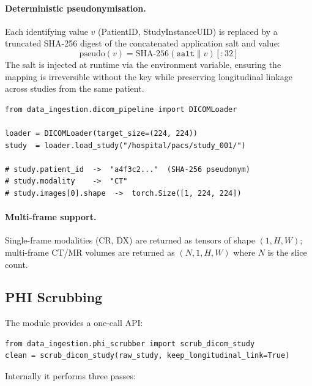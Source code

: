 \paragraph{Deterministic pseudonymisation.}
Each identifying value $v$ (PatientID, StudyInstanceUID) is replaced by a
truncated SHA-256 digest of the concatenated application salt and value:
\begin{equation}
  \mathrm{pseudo}(v) = \mathrm{SHA\text{-}256}(\texttt{salt} \| v)[:32]
  \label{eq:pseudo}
\end{equation}
The salt is injected at runtime via the
 environment variable, ensuring the mapping
is irreversible without the key while preserving longitudinal linkage across
studies from the same patient.

\begin{lstlisting}[caption={Using the DICOM loader.},
                   label={lst:dicom}]
from data_ingestion.dicom_pipeline import DICOMLoader

loader = DICOMLoader(target_size=(224, 224))
study  = loader.load_study("/hospital/pacs/study_001/")

# study.patient_id  ->  "a4f3c2..."  (SHA-256 pseudonym)
# study.modality    ->  "CT"
# study.images[0].shape  ->  torch.Size([1, 224, 224])
\end{lstlisting}

\paragraph{Multi-frame support.}
Single-frame modalities (CR, DX) are returned as tensors of shape
$(1, H, W)$; multi-frame CT/MR volumes are returned as $(N, 1, H, W)$
where $N$ is the slice count.

\subsection{PHI Scrubbing}
\label{sec:phi}

The  module provides a one-call API:
\begin{lstlisting}[caption={PHI scrubbing API.}, label={lst:phi}]
from data_ingestion.phi_scrubber import scrub_dicom_study
clean = scrub_dicom_study(raw_study, keep_longitudinal_link=True)
\end{lstlisting}

Internally it performs three passes:

